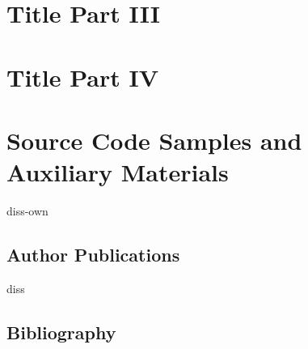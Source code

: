 \documentclass[%
	latex,%
	abstract,%
	pagesize, %
	a4paper,%
	twoside,%
	openright,
	bibtotoc,%
	liststotoc,%
	idxtotoc,%
	halfparskip,%
	chapterprefix,%
	headsepline,%
	pointlessnumbers,%
	normalheadings,	%
	13pt,%
]{scrreprt} %
\begin{document}
\part{Title Part III}



\part{Title Part IV}



\appendix
\part{Source Code Samples and Auxiliary Materials}




\listoffigures
\cleardoublepage

\listoftables
\cleardoublepage

%
%

{}
\begin{btSect}[unsrt]{diss-own}
\chapter*{Author Publications}

\makeatletter
\renewcommand\@biblabel[1]{\rule{\MyIndent+2em}{0em}}
\def\@biblabel#1{\textbullet}
\makeatother

\btPrintNotCited
\end{btSect}
\cleardoublepage

{}
\begin{btSect}[natdin]{diss}
\chapter*{Bibliography}
\btPrintCited
\end{btSect}
\cleardoublepage


\cleardoublepage





%
\end{document}
